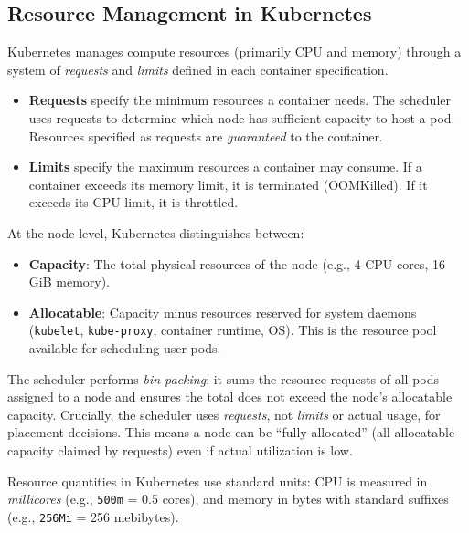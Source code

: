 \subsection{Resource Management in Kubernetes}
\label{subsec:k8s-resources}

Kubernetes manages compute resources (primarily CPU and memory) through a system of \textit{requests} and \textit{limits} defined in each container specification.

\begin{itemize}
    \item \textbf{Requests} specify the minimum resources a container needs. The scheduler uses requests to determine which node has sufficient capacity to host a pod. Resources specified as requests are \emph{guaranteed} to the container.

    \item \textbf{Limits} specify the maximum resources a container may consume. If a container exceeds its memory limit, it is terminated (OOMKilled). If it exceeds its CPU limit, it is throttled.
\end{itemize}

At the node level, Kubernetes distinguishes between:

\begin{itemize}
    \item \textbf{Capacity}: The total physical resources of the node (e.g., 4 CPU cores, 16 GiB memory).
    \item \textbf{Allocatable}: Capacity minus resources reserved for system daemons (\texttt{kubelet}, \texttt{kube-proxy}, container runtime, OS). This is the resource pool available for scheduling user pods.
\end{itemize}

The scheduler performs \textit{bin packing}: it sums the resource requests of all pods assigned to a node and ensures the total does not exceed the node's allocatable capacity. Crucially, the scheduler uses \emph{requests}, not \emph{limits} or actual usage, for placement decisions. This means a node can be ``fully allocated'' (all allocatable capacity claimed by requests) even if actual utilization is low.

Resource quantities in Kubernetes use standard units: CPU is measured in \textit{millicores} (e.g., \texttt{500m} = 0.5 cores), and memory in bytes with standard suffixes (e.g., \texttt{256Mi} = 256 mebibytes).

